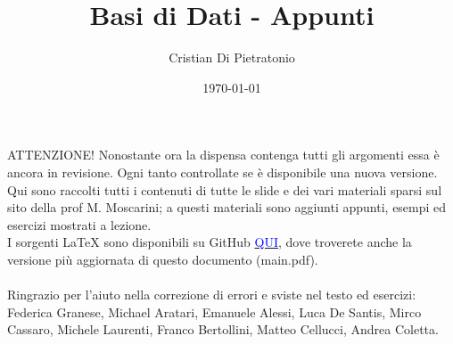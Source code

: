 \documentclass[a4paper,10pt]{article}
\title{\Huge Basi di Dati - Appunti}
\author{Cristian Di Pietratonio}
\date{\today}
\begin{document}
\maketitle

ATTENZIONE! Nonostante ora la dispensa contenga tutti gli argomenti essa è ancora in revisione.
Ogni tanto controllate se è disponibile una nuova versione.\\ 
Qui sono raccolti tutti i contenuti di tutte le slide e dei vari materiali sparsi sul sito della 
prof M. Moscarini; a questi materiali sono aggiunti appunti, esempi ed esercizi mostrati a lezione.\\ 
I sorgenti LaTeX sono disponibili su GitHub 
\href{https://github.com/Halolegend94/uni_database_appunti}{\textcolor{blue}{QUI}}, dove troverete 
anche la versione più aggiornata di questo documento (main.pdf).\\\\

Ringrazio per l'aiuto nella correzione di errori e sviste nel testo ed esercizi: Federica Granese, 
Michael Aratari, Emanuele Alessi, Luca De Santis, Mirco Cassaro, Michele Laurenti, Franco Bertollini,
Matteo Cellucci, Andrea Coletta.



\newpage
\setcounter{tocdepth}{3}
\tableofcontents
\newpage

\newpage

\newpage

\newpage

\newpage

\newpage

\newpage

\end{document}

